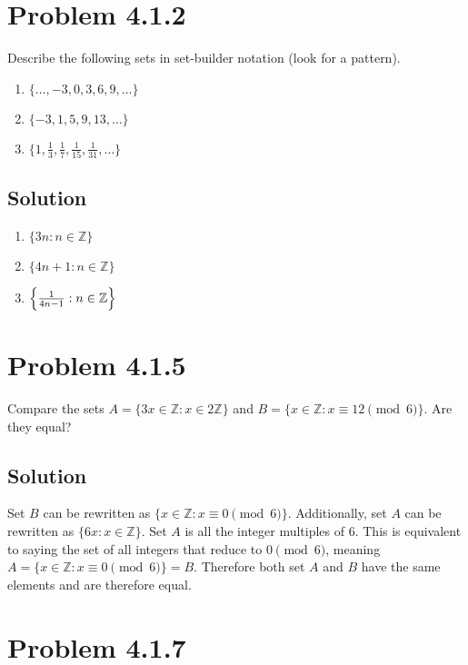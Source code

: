 \documentclass[12pt]{extarticle}
\begin{document}
\section*{Problem 4.1.2}

Describe the following sets in set-builder notation (look for a pattern). 
\begin{enumerate}[label=(\alph*)]
	\item $\{\ldots, -3, 0, 3, 6, 9,\ldots\}$
	\item $\{-3, 1, 5, 9, 13,\ldots\}$
	\item $\{1, \frac{1}{3} , \frac{1}{7} , \frac{1}{15} , \frac{1}{31} ,\ldots\}$
\end{enumerate}

\subsection*{Solution}

{
\everymath{\displaystyle}
\begin{enumerate}[label=(\alph*)]
	\item $\{ 3n : n \in \mathbb{Z} \}$
	\item $\{ 4n + 1 : n \in \mathbb{Z} \}$
	\item $\qty{ \frac{1}{4n - 1} : n \in \mathbb{Z} }$
\end{enumerate}
}

\section*{Problem 4.1.5}

Compare the sets $A = \{3x \in \mathbb{Z} : x \in 2 \mathbb{Z}\}$ and $B = \{x \in \mathbb{Z} : x \equiv 12 \pmod{6}\}$. Are they equal?

\subsection*{Solution}

Set $B$ can be rewritten as $\{ x \in \mathbb{Z} : x \equiv 0 \pmod{6} \}$. Additionally, set $A$ can be rewritten as $\{ 6x : x \in \mathbb{Z} \}$. Set $A$ is all the integer multiples of 6. This is equivalent to saying the set of all integers that reduce to $0 \pmod{6}$, meaning $A = \{ x \in \mathbb{Z} : x \equiv 0 \pmod{6} \} = B$. Therefore both set $A$ and $B$ have the same elements and are therefore equal.

\section*{Problem 4.1.7}
\end{document}
